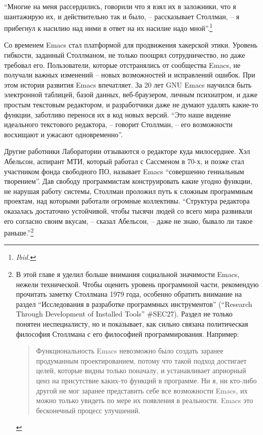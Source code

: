 \enquote{Многие на меня рассердились, говорили что я взял их в заложники, что я шантажирую их, и действительно так и было, -- рассказывает Столлман, -- я прибегнул к насилию над ними в ответ на их насилие надо мной}.\footnote{\textit{Ibid.}}

Со временем Emacs стал платформой для продвижения хакерской этики. Уровень гибкости, заданный Столлманом, не только поощрял сотрудничество, но даже требовал его. Пользователи, которые отстранялись от сообщества Emacs, не получали важных изменений -- новых возможностей и исправлений ошибок. При этом история развития Emacs впечатляет. За 20 лет GNU Emacs научился быть электронной таблицей, базой данных, веб-браузером, личным психиатром, и даже простым текстовым редактором, и разработчики даже не думают удалять какие-то функции, заботливо перенося их в код новых версий. \enquote{Это наше видение идеального текстового редактора, -- говорит Столлман, -- его возможности восхищают и ужасают одновременно}.

Другие работники Лаборатории отзываются о редакторе куда милосерднее. Хэл Абельсон, аспирант МТИ, который работал с Сассменом в 70-х, и позже стал участником фонда свободного ПО, называет Emacs \enquote{совершенно гениальным творением}. Дав свободу программистам конструировать какие угодно функции, не нарушая работу системы, Столлман проложил путь к сложным программным проектам, над которыми работали огромные коллективы. \enquote{Структура редактора оказалась достаточно устойчивой, чтобы тысячи людей со всего мира развивали его согласно своим вкусам, -- сказал Абельсон, -- даже не знаю, бывало ли такое раньше.}\footnote{В этой главе я уделил больше внимания социальной значимости Emacs, нежели технической. Чтобы оценить уровень программной части, рекомендую прочитать заметку Столлмана 1979 года, особенно обратить внимание на раздел \enquote{Исследования в разработке программных инструментов} (\enquote{Research Through Development of Installed Tools} \#SEC27). Раздел не только понятен неспециалисту, но и показывает, как сильно связана политическая философия Столлмана с его философией программирования. Например:

\begin{quote}
Функциональность Emacs невозможно было создать заранее продуманным проектированием, потому что такой подход достигает целей, которые видны только поначалу, и устанавливает априорный ценз на присутствие каких-то функций в программе. Ни я, ни кто-либо другой не мог заранее представить себе все возможности Emacs, их можно только увидеть по мере их появления в реальности. Emacs это бесконечный процесс улучшений.
\end{quote}}

